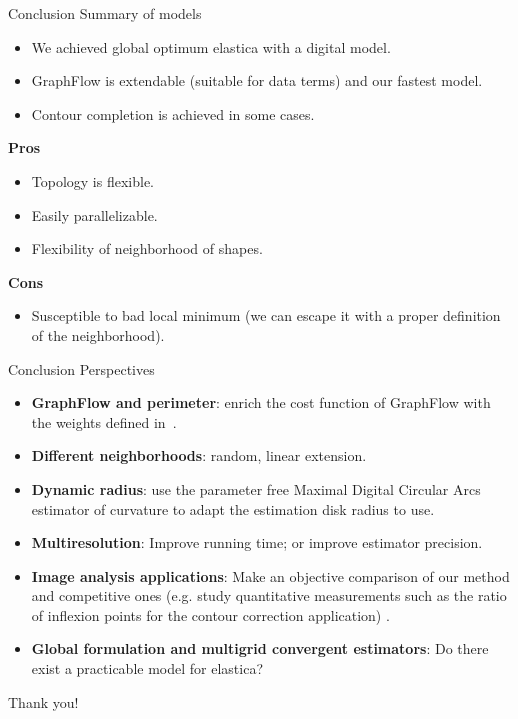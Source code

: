 \begin{frame}
{Conclusion}
{Summary of models}

\begin{itemize}
\item{We achieved global optimum elastica with a digital model.}
\pause
\item{GraphFlow is extendable (suitable for data terms) and our fastest model.}
\pause
\item{Contour completion is achieved in some cases.}
\pause
\end{itemize}

\textbf{Pros}
\begin{itemize}
\item{Topology is flexible.}
\pause
\item{Easily parallelizable.}
\pause
\item{Flexibility of neighborhood of shapes.}
\pause
\end{itemize}

\textbf{Cons}
\begin{itemize}
\item{Susceptible to bad local minimum (we can escape it with a proper definition of the neighborhood).}
\end{itemize}

\end{frame}

\begin{frame}
{Conclusion}
{Perspectives}

\begin{itemize}
\item{\textbf{GraphFlow and perimeter}: enrich the cost function of GraphFlow with the weights defined in~. }
\pause
\item{\textbf{Different neighborhoods}: random, linear extension.}
\pause
\item{\textbf{Dynamic radius}: use the parameter free Maximal Digital Circular Arcs estimator of curvature to adapt the estimation disk radius to use.}
\pause
\item{\textbf{Multiresolution}: Improve running time; or improve estimator precision.}
\pause
\item{\textbf{Image analysis applications}: Make an objective comparison of our method and competitive ones (e.g. study quantitative measurements such as the ratio of inflexion points for the contour correction application) .}
\pause
\item{\textbf{Global formulation and multigrid convergent estimators}: Do there exist a practicable model for elastica?}
\end{itemize}

\end{frame}

\begin{frame}
\huge
\center
Thank you!
\end{frame}
